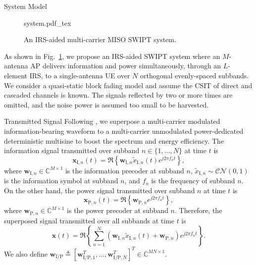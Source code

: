 \documentclass[journal,12pt,onecolumn,draftclsnofoot]{IEEEtran}
\begin{document}
	\begin{section}{System Model}\label{se:system_model}
		\begin{figure}[!t]
			\centering
			\def\svgwidth{0.5\columnwidth}
			{system.pdf_tex}
			\caption{An IRS-aided multi-carrier MISO SWIPT system.}
			\label{fi:system}
		\end{figure}

		As shown in Fig.~\ref{fi:system}, we propose an IRS-aided SWIPT system where an $M$-antenna AP delivers information and power simultaneously, through an $L$-element IRS, to a single-antenna UE over $N$ orthogonal evenly-spaced subbands. We consider a quasi-static block fading model and assume the CSIT of direct and cascaded channels is known. The signals reflected by two or more times are omitted, and the noise power is assumed too small to be harvested.


		\begin{subsection}{Transmitted Signal}
			Following \cite{Clerckx2018b}, we superpose a multi-carrier modulated information-bearing waveform to a multi-carrier unmodulated power-dedicated deterministic multisine to boost the spectrum and energy efficiency. The information signal transmitted over subband $n \in \{1, \dots, N\}$ at time $t$ is
			\begin{equation}
				\boldsymbol{x}_{\mathrm{I},n}(t) = \Re\left\{\boldsymbol{w}_{\mathrm{I},n} \tilde{x}_{\mathrm{I},n}(t) e^{j2{\pi}{f_n}{t}}\right\},
			\end{equation}
			where $\boldsymbol{w}_{\mathrm{I},n} \in \mathbb{C}^{M \times 1}$ is the information precoder at subband $n$, $\tilde{x}_{\mathrm{I},n}\sim\mathcal{CN}(0,1)$ is the information symbol at subband $n$, and $f_n$ is the frequency of subband $n$. On the other hand, the power signal transmitted over subband $n$ at time $t$ is
			\begin{equation}
				\boldsymbol{x}_{\mathrm{P},n}(t) = \Re\left\{\boldsymbol{w}_{\mathrm{P},n} e^{j2{\pi}{f_n}{t}}\right\},
			\end{equation}
			where $\boldsymbol{w}_{\mathrm{P},n} \in \mathbb{C}^{M \times 1}$ is the power precoder at subband $n$. Therefore, the superposed signal transmitted over all subbands at time $t$ is
			\begin{equation}
				\boldsymbol{x}(t) = \Re{\left\{\sum_{n=1}^N(\boldsymbol{w}_{\mathrm{I},n}\tilde{x}_{\mathrm{I},n}(t)+\boldsymbol{w}_{\mathrm{P},n}){e^{j2{\pi}{f_n}{t}}}\right\}}.
			\end{equation}
			We also define $\boldsymbol{w}_{\mathrm{I/P}} \triangleq [\boldsymbol{w}_{\mathrm{I/P},1}^T,\dots,\boldsymbol{w}_{\mathrm{I/P},N}^T]^T \in \mathbb{C}^{MN \times 1}$.
		\end{subsection}



\end{section}
\end{document}
